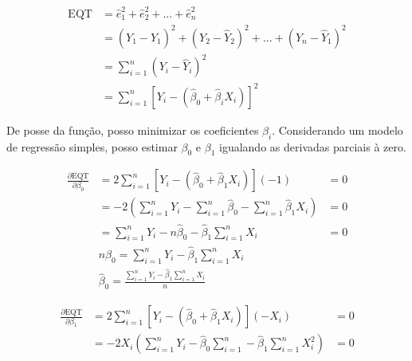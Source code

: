 \documentclass[
  12pt,
  letterpaper,
  DIV=11,
  numbers=noendperiod]{scrartcl}
\begin{document}
\begin{equation}
\begin{aligned}
\text{EQT} & = \hat{e}^2_1 + \hat{e}^2_2 + ... + \hat{e}^2_n \\
& = (Y_1 - \hat{Y}_1)^2 + (Y_2 - \hat{Y}_2)^2 + ... + (Y_n - \hat{Y}_1)^2 \\
& = \sum_{i=1}^{n}(Y_i - \hat{Y}_i)^2 \\
& = \sum_{i=1}^{n}[Y_i - (\hat{\beta}_0 + \hat{\beta}_iX_i)]^2
\end{aligned}
\end{equation}

De posse da função, posso minimizar os coeficientes \(\beta_i\).
Considerando um modelo de regressão simples, posso estimar \(\beta_0\) e
\(\beta_1\) igualando as derivadas parciais à zero.

\begin{equation}
\begin{aligned}
\frac{\partial \text{EQT}}{\partial \beta_0} & = 2\sum_{i=1}^{n}[Y_i - (\hat{\beta}_0 + \hat{\beta}_1X_i)] (-1) & = 0 \\
& = -2 (\sum_{i=1}^{n} Y_i - \sum_{i=1}^{n} \hat{\beta}_0 - \sum_{i=1}^{n} \hat{\beta}_1X_i) & = 0 \\
& = \sum_{i=1}^{n} Y_i - n\hat{\beta}_0 - \hat{\beta}_1 \sum_{i=1}^{n} X_i & = 0 \\
& n\hat{\beta}_0 = \sum_{i=1}^{n} Y_i - \hat{\beta}_1 \sum_{i=1}^{n} X_i \\
& \hat{\beta}_0 = \frac{\sum_{i=1}^{n} Y_i - \hat{\beta}_1 \sum_{i=1}^{n} X_i}{n}
\end{aligned}
\end{equation}

\begin{equation}
\begin{aligned}
\frac{\partial \text{EQT}}{\partial \beta_1} & = 2\sum_{i=1}^{n}[Y_i - (\hat{\beta}_0 + \hat{\beta}_1X_i)] (-X_i) & = 0 \\
& = -2X_i (\sum_{i=1}^{n} Y_i - \hat{\beta}_0\sum_{i=1}^{n} - \hat{\beta}_1\sum_{i=1}^{n} X_i^2) & = 0 \\
\end{aligned}
\end{equation}
\end{document}
